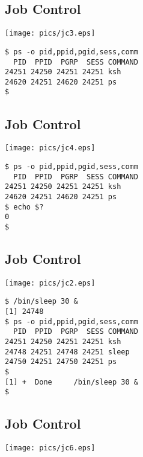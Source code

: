\documentclass[xga]{xdvislides}
\begin{document}
\subsection{Job Control}
\begin{center}
	\texttt{[image: pics/jc3.eps]}
\end{center}
\addvspace{.5in}
\begin{verbatim}
$ ps -o pid,ppid,pgid,sess,comm
  PID  PPID  PGRP  SESS COMMAND
24251 24250 24251 24251 ksh
24620 24251 24620 24251 ps
$
\end{verbatim}

\subsection{Job Control}
\begin{center}
	\texttt{[image: pics/jc4.eps]}
\end{center}
\addvspace{.5in}
\begin{verbatim}
$ ps -o pid,ppid,pgid,sess,comm
  PID  PPID  PGRP  SESS COMMAND
24251 24250 24251 24251 ksh
24620 24251 24620 24251 ps
$ echo $?
0
$
\end{verbatim}

\subsection{Job Control}
\begin{center}
	\texttt{[image: pics/jc2.eps]}
\end{center}
\begin{verbatim}
$ /bin/sleep 30 &
[1]	24748
$ ps -o pid,ppid,pgid,sess,comm
  PID  PPID  PGRP  SESS COMMAND
24251 24250 24251 24251 ksh
24748 24251 24748 24251 sleep
24750 24251 24750 24251 ps
$
[1] +  Done     /bin/sleep 30 &
$
\end{verbatim}

\subsection{Job Control}
\begin{center}
	\texttt{[image: pics/jc6.eps]}
\end{center}
\end{document}
